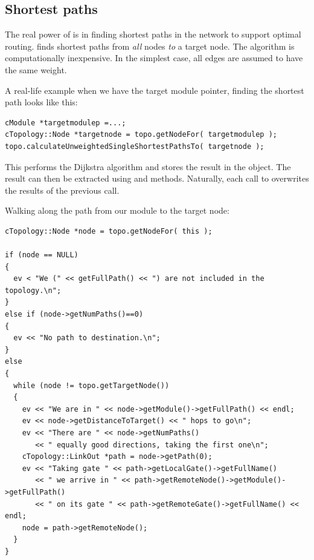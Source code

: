 \subsection{Shortest paths}

The real power of  is in finding shortest
paths in the network to support optimal
routing.  finds shortest paths
from \textit{all} nodes \textit{to} a target node. The algorithm is
computationally inexpensive. In the simplest case, all edges are
assumed to have the same weight.

A real-life example when we have the target module pointer, finding
the shortest path looks like this:

\begin{verbatim}
cModule *targetmodulep =...;
cTopology::Node *targetnode = topo.getNodeFor( targetmodulep );
topo.calculateUnweightedSingleShortestPathsTo( targetnode );
\end{verbatim}


This performs the Dijkstra algorithm and
stores the result in the  object. The result can
then be extracted using  and
 methods.  Naturally, each call to
 overwrites the results of
the previous call.

Walking along the path from our module to the target node:

\begin{verbatim}
cTopology::Node *node = topo.getNodeFor( this );

if (node == NULL)
{
  ev < "We (" << getFullPath() << ") are not included in the topology.\n";
}
else if (node->getNumPaths()==0)
{
  ev << "No path to destination.\n";
}
else
{
  while (node != topo.getTargetNode())
  {
    ev << "We are in " << node->getModule()->getFullPath() << endl;
    ev << node->getDistanceToTarget() << " hops to go\n";
    ev << "There are " << node->getNumPaths()
       << " equally good directions, taking the first one\n";
    cTopology::LinkOut *path = node->getPath(0);
    ev << "Taking gate " << path->getLocalGate()->getFullName()
       << " we arrive in " << path->getRemoteNode()->getModule()->getFullPath()
       << " on its gate " << path->getRemoteGate()->getFullName() << endl;
    node = path->getRemoteNode();
  }
}
\end{verbatim}


